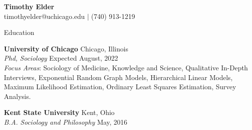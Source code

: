 \documentclass{resume}
\begin{document}
\begin{center}
\thispagestyle{empty}
\large \textbf{Timothy Elder \\}
\normalsize timothyelder@uchicago.edu $\mid$ (740) 913-1219 \\ %
\end{center}

\begin{rSection}{Education}

\textbf{University of Chicago} \hfill Chicago, Illinois\\
\textit{Phd, Sociology} \hfill Expected August, 2022\\ 

\textit{Focus Areas}: Sociology of Medicine, Knowledge and Science, Qualitative In-Depth Interviews, Exponential Random Graph Models, Hierarchical Linear Models, Maximum Likelihood Estimation, Ordinary Least Squares Estimation, Survey Analysis. 


\textbf{Kent State University} \hfill Kent, Ohio \\
\textit{B.A. Sociology and Philosophy} \hfill May, 2016\\

\end{rSection}
\end{document}
